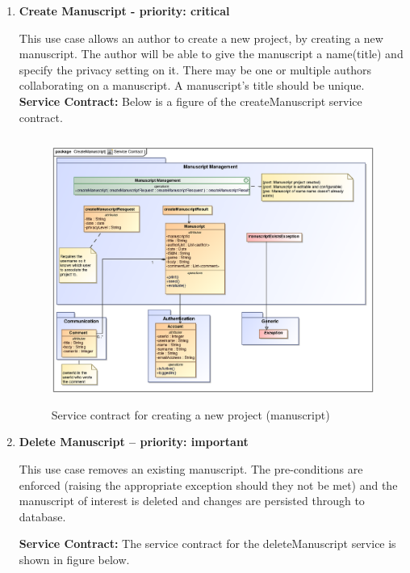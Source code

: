 \documentclass[12pt]{article}
\begin{document}
\begin{enumerate}
\item \textbf{Create Manuscript - priority: critical}

\par{This use case allows an author to create a new project, by creating a new manuscript. The author will be able to give the manuscript a name(title) and specify the privacy setting on it. There may be one or multiple authors collaborating on a manuscript.
A manuscript's title should be unique.}\\

\textbf{Service Contract:} Below is a figure of the createManuscript service contract.

\begin{figure}[h]
\includegraphics[height=330px, width=500px]{epsImages/ManuscriptManagement/createManuscriptServiceContract.eps}
\caption{Service contract for creating a new project (manuscript)}
\end{figure}

\newpage
\item \textbf{Delete Manuscript – priority: important}
\par{This use case removes an existing manuscript. The pre-conditions are enforced (raising the appropriate exception should they not be met) and the manuscript of interest is deleted and changes are persisted through to database.}

\par{\textbf{Service Contract:} 
The service contract for the deleteManuscript  service is shown in figure below. }


\end{enumerate}
\end{document}
